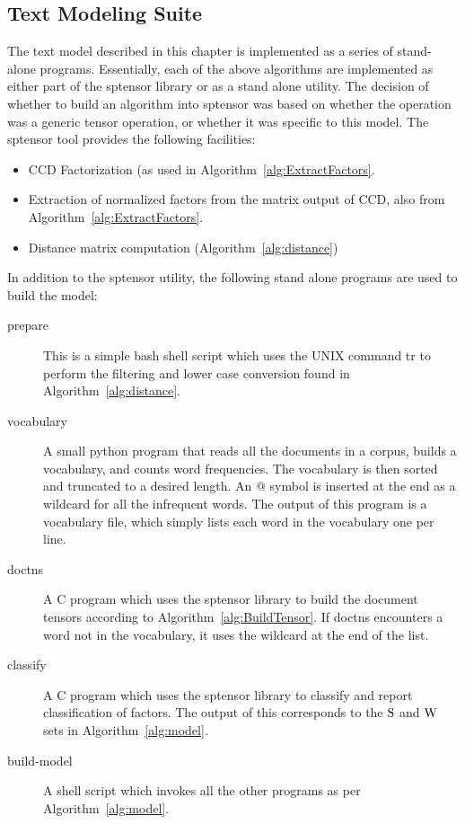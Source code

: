 \documentclass[../ut-dissertation.tex]{subfiles}
\begin{document}
\subsection{Text Modeling Suite}
The text model described in this chapter is implemented as a series of
stand-alone programs.  Essentially, each of the above algorithms are
implemented as either part of the sptensor library or as a stand alone
utility.  The decision of whether to build an algorithm into sptensor
was based on whether the operation was a generic tensor operation, or
whether it was specific to this model.  The sptensor tool provides the
following facilities:
\begin{itemize}
\item CCD Factorization (as used in
  Algorithm~\ref{alg:ExtractFactors}.
\item Extraction of normalized factors from the matrix output of CCD,
  also from Algorithm~\ref{alg:ExtractFactors}.
\item Distance matrix computation (Algorithm~\ref{alg:distance})
\end{itemize}

In addition to the sptensor utility, the following stand alone
programs are used to build the model:
\begin{description}
\item[prepare] This is a simple bash shell script which uses the UNIX
  command tr to perform the filtering and lower case conversion found
  in Algorithm~\ref{alg:distance}.
\item[vocabulary] A small python program that reads all the documents
  in a corpus, builds a vocabulary, and counts word frequencies.  The
  vocabulary is then sorted and truncated to a desired length.  An @
  symbol is inserted at the end as a wildcard for all the infrequent
  words.  The output of this program is a vocabulary file, which
  simply lists each word in the vocabulary one per line.
\item[doctns] A C program which uses the sptensor library to build the
  document tensors according to Algorithm~\ref{alg:BuildTensor}.  If
  doctns encounters a word not in the vocabulary, it uses the wildcard
  at the end of the list.
\item[classify] A C program which uses the sptensor library to
  classify and report classification of factors.  The output of this
  corresponds to the $\mathrm{S}$ and $\mathrm{W}$ sets in Algorithm~\ref{alg:model}.
\item[build-model] A shell script which invokes all the other
  programs as per Algorithm~\ref{alg:model}.
\end{description}
\end{document}
